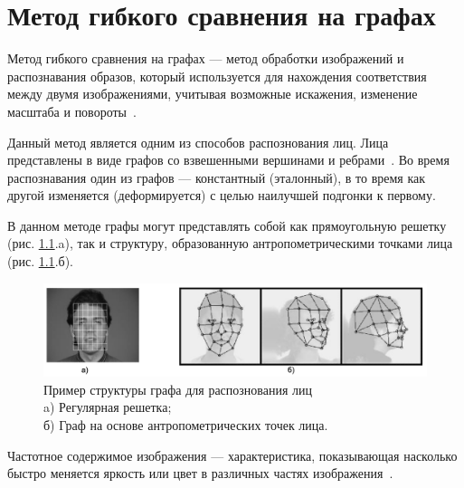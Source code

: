 \chapter{Метод гибкого сравнения на графах}

Метод гибкого сравнения на графах --- метод обработки изображений и распознавания образов, который 
используется для нахождения соответствия между двумя изображениями, учитывая возможные искажения, изменение масштаба и повороты~\cite{distances}.

Данный метод является одним из способов распознования лиц.
Лица представлены в виде графов со взвешенными
вершинами и ребрами~\cite{wen}. 
Во время распознавания один из графов --- константный (эталонный), 
в то время как другой изменяется (деформируется) с 
целью наилучшей подгонки к первому. 

В данном методе графы могут представлять собой как 
прямоугольную решетку (рис. \ref{img:ant}.a), так и структуру, образованную антропометрическими
точками лица (рис. \ref{img:ant}.б).

\begin{figure}[h]
    \centering
    \includegraphics[height=0.15\textheight]{img/ex.jpg}
    \caption{Пример структуры графа для распознования лиц \\ 
    a) Регулярная решетка; \\ б) Граф на основе антропометрических точек лица.}
    \label{img:ant}
\end{figure}

Частотное содержимое изображения --- характеристика, показывающая насколько быстро 
меняется яркость или цвет в различных частях изображения~\cite{chst}.

